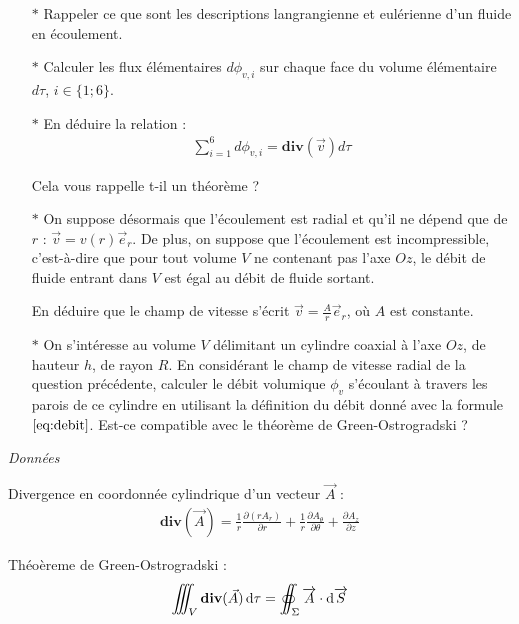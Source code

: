 \documentclass{report}
\begin{document}
\begin{itemize}

	\item[$\ast$] Rappeler ce que sont les descriptions langrangienne et eulérienne d'un fluide en écoulement.
	
	\item[$\ast$] Calculer les flux élémentaires $d\phi_{v,i}$ sur chaque face du volume élémentaire $d\tau$, $i\in\{1;6\}$.
	
	\item[$\ast$] En déduire la relation :
	\begin{align*}
	 	\sum_{i=1}^6 d\phi_{v,i} = \mathbf{div}(\vec{v})d\tau
	\end{align*}

	Cela vous rappelle t-il un théorème ?
	
	\item[$\ast$] On suppose désormais que l'écoulement est radial et qu'il ne dépend que de $r$ : $\vec{v}=v(r)\vec{e}_r$. De plus, on suppose que l'écoulement est incompressible, c'est-à-dire que pour tout volume $V$ ne contenant pas l'axe $Oz$, le débit de fluide entrant dans $V$ est égal au débit de fluide sortant.
	
	En déduire que le champ de vitesse s'écrit $\vec{v}=\frac{A}{r}\vec{e}_r$, où $A$ est constante.
	
	\item[$\ast$] On s'intéresse au volume $V$ délimitant un cylindre coaxial à l'axe $Oz$, de hauteur $h$, de rayon $R$. En considérant le champ de vitesse radial de la question précédente, calculer le débit volumique $\phi_v$ s'écoulant à travers les parois de ce cylindre en utilisant la définition du débit donné avec la formule $\ref{eq:debit}$. Est-ce compatible avec le théorème de Green-Ostrogradski ?
	
\end{itemize}

\textit{Données}

Divergence en coordonnée cylindrique d'un vecteur $\vec{A}$ :
\begin{align*}
\mathbf{div}(\vec{A})=\frac{1}{r}\frac{\partial (r A_r)}{\partial r} + \frac{1}{r}\frac{\partial A_\theta}{\partial \theta} + \frac{\partial A_z}{\partial z}
\end{align*}

Théoèreme de Green-Ostrogradski :
\begin{align*}
\int\!\!\!\!\!\int\!\!\!\!\!\int_{V} \mathbf{div}(\vec{A})\, {\rm d}\tau =
\int\!\!\!\!\!\!\!\subset\!\!\!\supset\!\!\!\!\!\!\!\int_{\Sigma}  \overrightarrow A \cdot \mathrm d \overrightarrow{S}
\end{align*}
\end{document}
